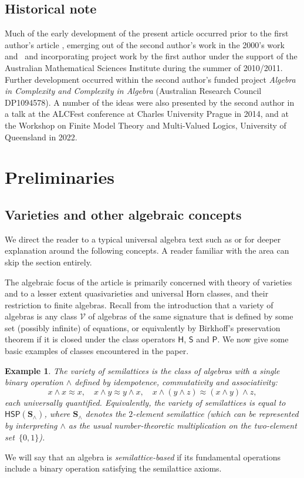 \documentclass[reqno]{amsart}
\theoremstyle{plain}
\newtheorem{example}[thm]{Example}
\theoremstyle{definition}
\newcommand{\up}[1]{\textup{#1}}
\begin{document}
\subsection{Historical note}
Much of the early development of the present article occurred prior to the first author's article \cite{ham},  emerging out of the second author's work in the 2000's work~\cite{CDJP} and~\cite{jac:flat} and incorporating project work by the first author under the support of the Australian Mathematical Sciences Institute during the summer of 2010/2011.  
Further development occurred within the second author's funded project \emph{Algebra in Complexity and Complexity in Algebra} (Australian Research Council DP1094578).  
A number of the ideas were also presented by the second author in a talk at the ALCFest conference at Charles University Prague in 2014, and at the Workshop on Finite Model Theory and Multi-Valued Logics, University of Queensland in 2022.


\section{Preliminaries} 
\subsection{Varieties and other algebraic concepts}\label{subsec:prelimvarieties}
We direct the reader to a typical universal algebra text such as \cite{ber} or \cite{bursan} for deeper explanation around the following concepts.  A reader familiar with the area can skip the section entirely.


The algebraic focus of the article is primarily concerned with theory of varieties and to a lesser extent quasivarieties and universal Horn classes, and their restriction to finite algebras.
Recall from the introduction that a variety of algebras is any class $\mathscr{V}$ of algebras of the same signature that is defined by some set (possibly infinite) of equations, or equivalently by Birkhoff's preservation theorem if it is closed under the class operators $\mathsf{H}$, $\mathsf{S}$ and $\mathsf{P}$.  
 We now give some basic examples of classes encountered in the paper.
 \begin{example}
The variety of semilattices is the class of algebras with a single binary operation $\wedge$ defined by idempotence, commutativity and associativity\up:
 \[
 x\wedge x\approx x,\quad x\wedge y\approx y\wedge x, \quad x\wedge (y\wedge z)\approx (x\wedge y)\wedge z,
 \]
 each universally quantified.  
 Equivalently, the variety of semilattices is equal to $\mathsf{HSP}(\mathbf{S}_\wedge)$, where $\mathbf{S}_\wedge$ denotes the $2$-element semilattice \up(which can be represented by interpreting $\wedge$ as the usual number-theoretic multiplication on the two-element set~$\{0,1\}$\up).
 \end{example}
 We will say that an algebra is \emph{semilattice-based} if its fundamental operations include a binary operation satisfying the semilattice axioms.
 
\end{document}
